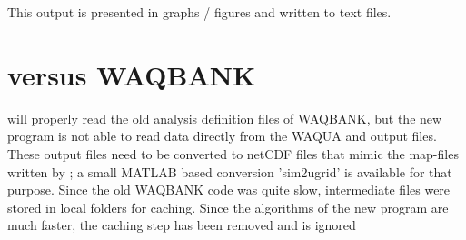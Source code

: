 This output is presented in graphs / figures and written to text files.

\section{\dfastbe versus WAQBANK}

\dfastbe will properly read the old analysis definition files of WAQBANK, but the new program is not able to read data directly from the WAQUA and \dflow output files.
These output files need to be converted to netCDF files that mimic the map-files written by \dflowfm; a small MATLAB based conversion 'sim2ugrid' is available for that purpose.
Since the old WAQBANK code was quite slow, intermediate files were stored in local folders for caching.
Since the algorithms of the new \dfastbe program are much faster, the caching step has been removed and  is ignored

